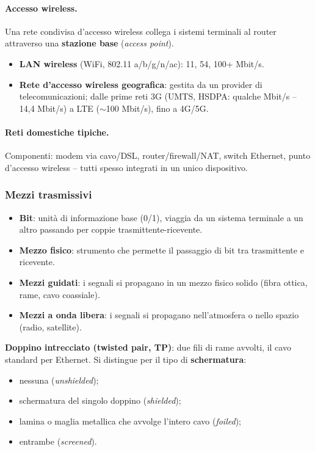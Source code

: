 \documentclass[12pt, a4paper]{article}
\begin{document}
\paragraph{Accesso wireless.}
Una rete condivisa d'accesso wireless collega i sistemi terminali al router attraverso una \textbf{stazione base} (\textit{access point}).
\begin{itemize}
    \item \textbf{LAN wireless} (WiFi, 802.11 a/b/g/n/ac): 11, 54, 100+ Mbit/s.
    \item \textbf{Rete d'accesso wireless geografica}: gestita da un provider di telecomunicazioni; dalle prime reti 3G (UMTS, HSDPA: qualche Mbit/s -- 14,4 Mbit/s) a LTE ($\sim$100 Mbit/s), fino a 4G/5G.
\end{itemize}

\paragraph{Reti domestiche tipiche.}
Componenti: modem via cavo/DSL, router/firewall/NAT, switch Ethernet, punto d'accesso wireless -- tutti spesso integrati in un unico dispositivo.

\subsubsection{Mezzi trasmissivi}

\begin{tcolorbox}[colback=lightergray!10, colframe=tocsec, title=\textbf{Definizioni}]
\begin{itemize}
    \item \textbf{Bit}: unità di informazione base (0/1), viaggia da un sistema terminale a un altro passando per coppie trasmittente-ricevente.
    \item \textbf{Mezzo fisico}: strumento che permette il passaggio di bit tra trasmittente e ricevente.
    \item \textbf{Mezzi guidati}: i segnali si propagano in un mezzo fisico solido (fibra ottica, rame, cavo coassiale).
    \item \textbf{Mezzi a onda libera}: i segnali si propagano nell'atmosfera o nello spazio (radio, satellite).
\end{itemize}
\end{tcolorbox}

\textbf{Doppino intrecciato (twisted pair, TP)}: due fili di rame avvolti, il cavo standard per Ethernet. Si distingue per il tipo di \textbf{schermatura}:
\begin{itemize}
    \item nessuna (\textit{unshielded});
    \item schermatura del singolo doppino (\textit{shielded});
    \item lamina o maglia metallica che avvolge l'intero cavo (\textit{foiled});
    \item entrambe (\textit{screened}).
\end{itemize}
\end{document}
